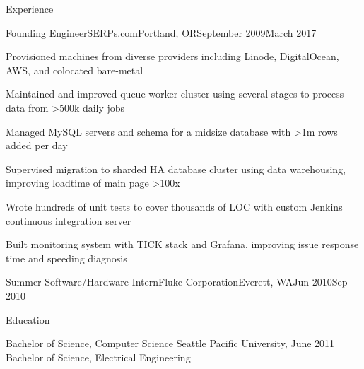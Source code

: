 \documentclass[letterpaper,10pt]{article}
\begin{document}
\begin{rsection}{Experience}
\begin{rexperienceitem}{Founding Engineer}{SERPs.com}{Portland, OR}{September 2009}{March 2017}
  \item Provisioned machines from diverse providers including Linode, DigitalOcean, AWS, and colocated bare-metal
  \item Maintained and improved queue-worker cluster using several stages to process data from \textgreater500k daily jobs
  \item Managed MySQL servers and schema for a midsize database with \textgreater1m rows added per day
  \item Supervised migration to sharded HA database cluster using data warehousing,
        improving loadtime of main page \textgreater100x
  \item Wrote hundreds of unit tests to cover thousands of LOC with custom Jenkins continuous integration server
  \item Built monitoring system with TICK stack and Grafana, improving issue response time and speeding diagnosis
\end{rexperienceitem}
\begin{rexperience}{Summer Software/Hardware Intern}{Fluke Corporation}{Everett, WA}{Jun 2010}{Sep 2010}
\end{rexperience}
\end{rsection}

\begin{rsection}{Education}
\begin{rcontent}{Bachelor of Science, Computer Science
  \textnormal{%
      \sffamily
      \normalsize
      \hfill
      Seattle Pacific University, June 2011}\\
  Bachelor of Science, Electrical Engineering
}
\end{rcontent}
\end{rsection}
\end{document}
